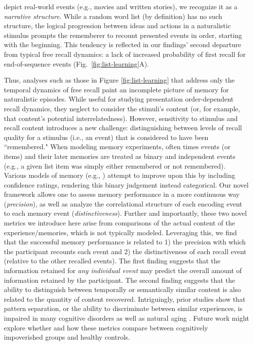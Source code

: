 \documentclass{article}
\begin{document}
depict real-world events (e.g., movies and written stories), we recognize it as a \textit{narrative structure}.  While a random word list (by definition) has no such structure, the logical progression between ideas and actions in a naturalistic stimulus prompts the rememberer to recount presented events in order, starting with the beginning.  This tendency is reflected in our findings' second departure from typical free recall dynamics: a lack of increased probability of first recall for end-of-sequence events (Fig.~\ref{fig:list-learning}A).


Thus, analyses such as those in Figure \ref{fig:list-learning} that address only the temporal dynamics of free recall paint an incomplete picture of memory for naturalistic episodes.  While useful for studying presentation order-dependent recall dynamics, they neglect to consider the stimuli's content (or, for example, that content's potential interrelatedness).  However, sensitivity to stimulus and recall content introduces a new challenge: distinguishing between levels of recall quality for a stimulus (i.e., an event) that is considered to have been ``remembered."  When modeling memory experiments, often times events (or items) and their later memories are treated as binary and independent events (e.g., a given list item was simply either remembered or not remembered).  Various models of memory (e.g., \citealp{Yone02}) attempt to improve upon this by including confidence ratings, rendering this binary judgement instead categorical.  Our novel framework allows one to assess memory performance in a more continuous way (\textit{precision}), as well as analyze the correlational structure of each encoding event to each memory event (\textit{distinctiveness}). Further and importantly, these two novel metrics we introduce here arise from comparisons of the actual content of the experience/memories, which is not typically modeled.  Leveraging this, we find that the successful memory performance is related to 1) the precision with which the participant recounts each event and 2) the distinctiveness of each recall event (relative to the other recalled events). The first finding suggests that the information retained for \textit{any individual event} may predict the overall amount of information retained by the participant.  The second finding suggests that the ability to distinguish between temporally or semantically similar content is also related to the quantity of content recovered. Intriguingly, prior studies show that pattern separation, or the ability to discriminate between similar experiences, is impaired in many cognitive disorders as well as natural aging \citep{StarEtal10, YassEtal11c, YassStar11b}.  Future work might explore whether and how these metrics compare between cognitively impoverished groups and healthy controls.
\end{document}
